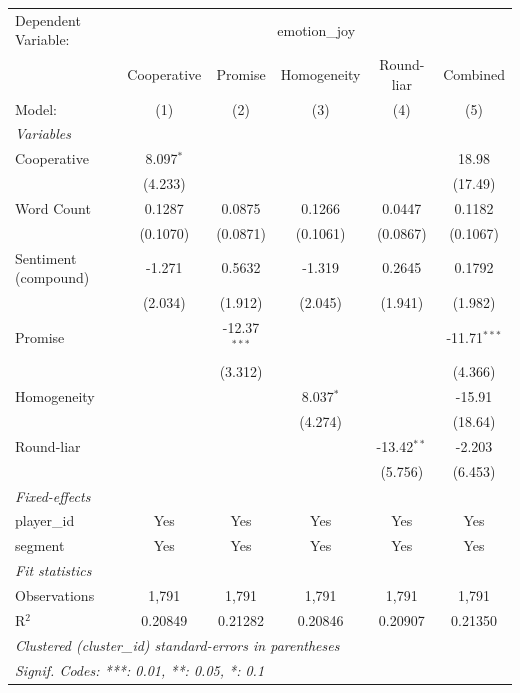 
\begingroup
\centering
\begin{tabular}{lccccc}
   \tabularnewline \midrule \midrule
   Dependent Variable: & \multicolumn{5}{c}{emotion\_joy}\\
                        & Cooperative & Promise        & Homogeneity & Round-liar    & Combined \\   
   Model:               & (1)         & (2)            & (3)         & (4)           & (5)\\  
   \midrule
   \emph{Variables}\\
   Cooperative          & 8.097$^{*}$ &                &             &               & 18.98\\   
                        & (4.233)     &                &             &               & (17.49)\\   
   Word Count           & 0.1287      & 0.0875         & 0.1266      & 0.0447        & 0.1182\\   
                        & (0.1070)    & (0.0871)       & (0.1061)    & (0.0867)      & (0.1067)\\   
   Sentiment (compound) & -1.271      & 0.5632         & -1.319      & 0.2645        & 0.1792\\   
                        & (2.034)     & (1.912)        & (2.045)     & (1.941)       & (1.982)\\   
   Promise              &             & -12.37$^{***}$ &             &               & -11.71$^{***}$\\   
                        &             & (3.312)        &             &               & (4.366)\\   
   Homogeneity          &             &                & 8.037$^{*}$ &               & -15.91\\   
                        &             &                & (4.274)     &               & (18.64)\\   
   Round-liar           &             &                &             & -13.42$^{**}$ & -2.203\\   
                        &             &                &             & (5.756)       & (6.453)\\   
   \midrule
   \emph{Fixed-effects}\\
   player\_id           & Yes         & Yes            & Yes         & Yes           & Yes\\  
   segment              & Yes         & Yes            & Yes         & Yes           & Yes\\  
   \midrule
   \emph{Fit statistics}\\
   Observations         & 1,791       & 1,791          & 1,791       & 1,791         & 1,791\\  
   R$^2$                & 0.20849     & 0.21282        & 0.20846     & 0.20907       & 0.21350\\  
   \midrule \midrule
   \multicolumn{6}{l}{\emph{Clustered (cluster\_id) standard-errors in parentheses}}\\
   \multicolumn{6}{l}{\emph{Signif. Codes: ***: 0.01, **: 0.05, *: 0.1}}\\
\end{tabular}
\par\endgroup


